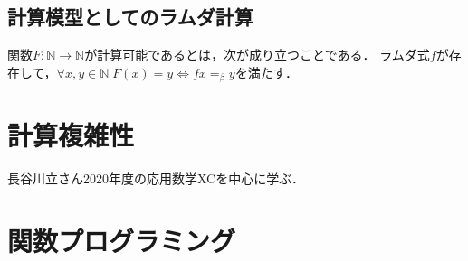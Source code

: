 \documentclass[uplatex, 12pt, dvipdfmx]{jsreport}
\begin{document}
\section{計算模型としてのラムダ計算}

\begin{definition}[computability]
    関数$F:\mathbb{N}\to\mathbb{N}$が計算可能であるとは，次が成り立つことである．
    ラムダ式$f$が存在して，$\forall x,y\in\mathbb{N}\; F(x)=y\Leftrightarrow fx=_\beta y$を満たす．
\end{definition}

\chapter{計算複雑性}
長谷川立さん2020年度の応用数学XCを中心に学ぶ．

\chapter{関数プログラミング}
\end{document}
